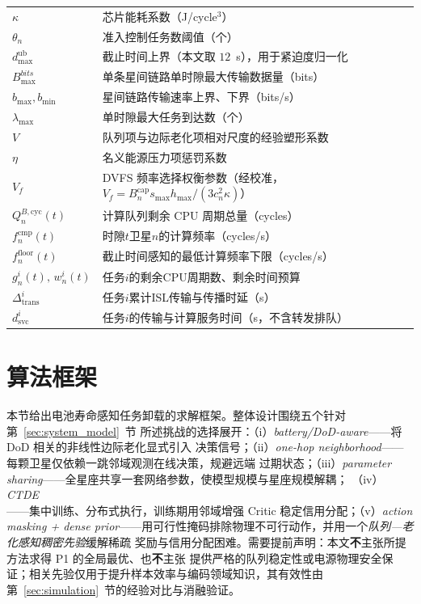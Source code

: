 \documentclass[a4paper,11pt]{article}
\begin{document}
\begin{table}[t]
\begin{tabular}{ll}
$\kappa$ & 芯片能耗系数（J/cycle$^3$） \\
$\theta_n$ & 准入控制任务数阈值（个） \\
$d^{\mathrm{ub}}_{\max}$ & 截止时间上界（本文取 $12$~s），用于紧迫度归一化 \\
$B^{bits}_{\max}$ & 单条星间链路单时隙最大传输数据量（bits） \\
$b_{\max}, b_{\min}$ & 星间链路传输速率上界、下界（bits/s） \\
$\lambda_{\max}$ & 单时隙最大任务到达数（个） \\
$V$ & 队列项与边际老化项相对尺度的经验塑形系数 \\
$\eta$ & 名义能源压力项惩罚系数 \\
$V_f$ & DVFS 频率选择权衡参数（经校准，$V_f=B^{\mathrm{cap}}_n s_{\max} h_{\max}/(3c_n^2\kappa)$） \\
$Q^{B,\mathrm{cyc}}_n(t)$ & 计算队列剩余 CPU 周期总量（cycles） \\
$f^{\mathrm{cmp}}_n(t)$ & 时隙$t$卫星$n$的计算频率（cycles/s） \\
$f^{\mathrm{floor}}_n(t)$ & 截止时间感知的最低计算频率下限（cycles/s） \\
$g^i_n(t),\,w^i_n(t)$ & 任务$i$的剩余CPU周期数、剩余时间预算 \\
$\Delta^i_{\mathrm{trans}}$ & 任务$i$累计ISL传输与传播时延（s） \\
$d^i_{\mathrm{svc}}$ & 任务$i$的传输与计算服务时间（s，不含转发排队） \\
\bottomrule
\end{tabular}
\end{table}

\section{算法框架}
\label{sec:algorithm}

本节给出电池寿命感知任务卸载的求解框架。整体设计围绕五个针对第~\ref{sec:system_model}~节
所述挑战的选择展开：（i）\emph{battery/DoD-aware}——将 DoD 相关的非线性边际老化显式引入
决策信号；（ii）\emph{one-hop neighborhood}——每颗卫星仅依赖一跳邻域观测在线决策，规避远端
过期状态；（iii）\emph{parameter sharing}——全星座共享一套网络参数，使模型规模与星座规模解耦；
（iv）\emph{CTDE}——集中训练、分布式执行，训练期用邻域增强 Critic 稳定信用分配；（v）\emph{action
masking + dense prior}——用可行性掩码排除物理不可行动作，并用一个\emph{队列—老化感知稠密先验}缓解稀疏
奖励与信用分配困难。需要提前声明：本文\textbf{不}主张所提方法求得 P1 的全局最优、也\textbf{不}主张
提供严格的队列稳定性或电源物理安全保证；相关先验仅用于提升样本效率与编码领域知识，其有效性由
第~\ref{sec:simulation}~节的经验对比与消融验证。
\end{document}
